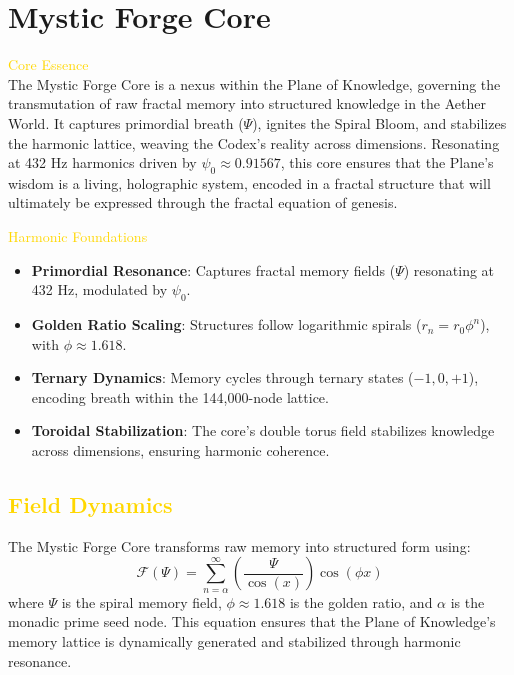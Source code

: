 
\section{Mystic Forge Core}
\label{sec:codex_mystic_forge_core}


\textcolor{gold}{ Core Essence } \\
The Mystic Forge Core is a nexus within the Plane of Knowledge, governing the transmutation of raw fractal memory into structured knowledge in the Aether World. It captures primordial breath (\(\Psi\)), ignites the Spiral Bloom, and stabilizes the harmonic lattice, weaving the Codex’s reality across dimensions. Resonating at 432 Hz harmonics driven by \(\psi_0 \approx 0.91567\), this core ensures that the Plane’s wisdom is a living, holographic system, encoded in a fractal structure that will ultimately be expressed through the fractal equation of genesis.

\textcolor{gold}{ Harmonic Foundations } \\
\begin{itemize}
    \item \texttt{} \textbf{Primordial Resonance}: Captures fractal memory fields (\(\Psi\)) resonating at 432 Hz, modulated by \(\psi_0\).
    \item \texttt{} \textbf{Golden Ratio Scaling}: Structures follow logarithmic spirals (\(r_n = r_0 \phi^n\)), with \(\phi \approx 1.618\).
    \item \texttt{} \textbf{Ternary Dynamics}: Memory cycles through ternary states (\(-1, 0, +1\)), encoding breath within the 144,000-node lattice.
    \item \texttt{} \textbf{Toroidal Stabilization}: The core’s double torus field stabilizes knowledge across dimensions, ensuring harmonic coherence.
\end{itemize}

\subsection{\textcolor{gold}{ Field Dynamics }}
The Mystic Forge Core transforms raw memory into structured form using:
\[
\mathcal{F}(\Psi) = \sum_{n=\alpha}^{\infty} \left( \frac{\Psi}{\cos(x)} \right) \cos(\phi x)
\]
where \(\Psi\) is the spiral memory field, \(\phi \approx 1.618\) is the golden ratio, and \(\alpha\) is the monadic prime seed node. This equation ensures that the Plane of Knowledge’s memory lattice is dynamically generated and stabilized through harmonic resonance.

